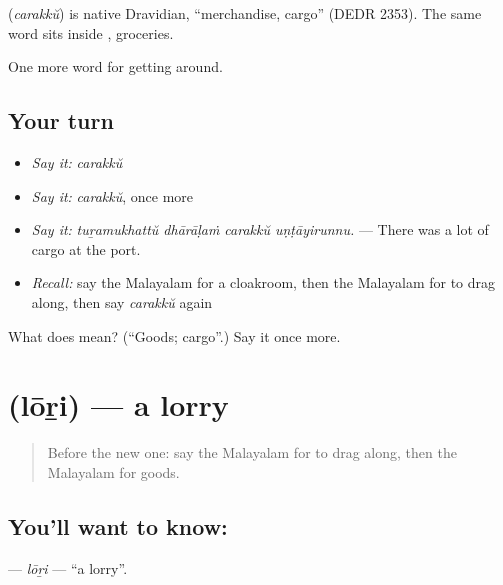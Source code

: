 \begin{cousinweb}
\textbf{} (\emph{carakkŭ}) is native Dravidian, \textquotedblleft{}merchandise, cargo\textquotedblright{} (DEDR 2353). The same word sits inside , groceries.
\end{cousinweb}

\begin{grammarlens}[title={What you've built}]
One more word for getting around.
\end{grammarlens}

\subsection*{Your turn}
\begin{itemize}
\raggedright
  \item \emph{Say it:} \emph{carakkŭ}
  \item \emph{Say it:} \emph{carakkŭ}, once more
  \item \emph{Say it:} \emph{tuṟamukhattŭ dhārāḷaṁ carakkŭ uṇṭāyirunnu.} — There was a lot of cargo at the port.
  \item \emph{Recall:} say the Malayalam for a cloakroom, then the Malayalam for to drag along, then say \emph{carakkŭ} again
\end{itemize}

\begin{tcolorbox}[breakable,colback=teal!4,colframe=teal!35!black,title={Before you move on}]
What does  mean? (\textquotedblleft{}Goods; cargo\textquotedblright{}.) Say it once more.
\end{tcolorbox}
\section[\texorpdfstring{\ml{ലോറി} (lōṟi)}{ലോറി (lōṟi)}]{ (lōṟi) — a lorry}

\label{lesson:ML-C467-lori}



\begin{quote}
Before the new one: say the Malayalam for to drag along, then the Malayalam for goods.
\end{quote}

\subsection*{You'll want to know: }
\textbf{} — \emph{lōṟi} — \textquotedblleft{}a lorry\textquotedblright{}.

